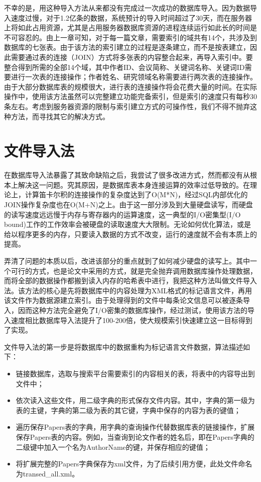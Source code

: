 不幸的是，用这种导入方法从来都没有完成过一次成功的数据库导入。因为数据导入速度过慢，对于1.2亿条的数据，系统预计的导入时间超过了30天，而在服务器上将如此占用资源，尤其是占用服务器数据库资源的进程连续运行如此长的时间是不可容忍的。由上一章可知，对于每一篇文章，需要索引的域共有14个，共涉及到数据库的七张表。由于该方法的索引建立的过程是逐条建立，而不是按表建立，因此需要通过表的连接（JOIN）方式将多张表的内容整合起来，再导入索引中。要整合得到所需的全部14个域，其中作者ID、会议简称、关键词名称、关键词ID需要进行一次表的连接操作；作者姓名、研究领域名称需要进行两次表的连接操作。由于大部分数据库表的规模很大，进行表的连接操作将会花费大量的时间。在实际操作中，使用该方法虽然可以完整建立功能完备索引，但是索引的速度只有每秒30条左右。考虑到服务器资源的限制与索引建立方式的可操作性，我们不得不抛弃这种方法，而寻找其它的解决方式。

\section{文件导入法}
在数据库导入法暴露了其致命缺陷之后，我尝试了很多改进方式，然而都没有从根本上解决这一问题。究其原因，是数据库表本身连接运算的效率过低导致的。在理论上，计算笛卡尔积的连接操作的复杂度达到了O(M*N)，经过SQL内部优化的JOIN操作复杂度也在O(M+N)之上。由于这一部分涉及到大量硬盘读写，而硬盘的读写速度远远慢于内存与寄存器内的运算速度，这一典型的I/O密集型(I/O bound)工作的工作效率会被硬盘的读取速度大大限制。无论如何优化算法，或是给以程序更多的内存，只要读入数据的方式不改变，运行的速度就不会有本质上的提高。

弄清了问题的本质以后，改进该部分的重点就到了如何减少硬盘的读写上。其中一个可行的方式，也是论文中采用的方式，就是完全抛弃调用数据库操作处理数据，而将全部的数据操作都搬到读入内存的哈希表中进行，我把这种方法叫做文件导入法。该方法的核心是先将数据库中的内容处理为XML格式的标记语言文件，再用该文件作为数据源建立索引。由于处理得到的文件中每条论文信息可以被逐条导入，因而这种方法完全避免了I/O密集的数据库操作，经过测试，使用该方法的导入速度相比数据库导入法提升了100-200倍，使大规模索引快速建立这一目标得到了实现。

文件导入法的第一步是将数据库中的数据重构为标记语言文件数据，算法描述如下：

\begin{itemize}
\item 链接数据库，选取与搜索平台需要索引的内容相关的表，将表中的内容导出到文件中；
\item 依次读入这些文件，用二级字典的形式保存文件内容。其中，字典的第一级为表的主键，字典的第二级为表的其它键，字典中保存的内容为表的键值；
\item 遍历保存Papers表的字典，用字典的查询操作代替数据库表的链接操作，扩展保存Papers表的内容。例如，当查询到论文作者的姓名后，即在Papers字典的二级键中加入一个名为AuthorName的键，并保存相应的键值；
\item 将扩展完整的Papers字典保存为xml文件，为了后续引用方便，此处文件命名为transed\_all.xml。
\end{itemize}

